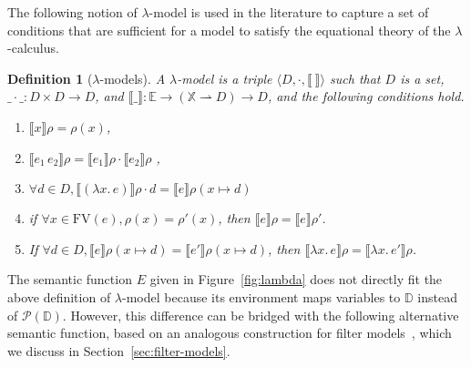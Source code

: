 \documentclass{tufte-handout}
\newcommand{\SEM}[1]{\llbracket #1 \rrbracket}
\newcommand{\LAM}[1]{\lambda #1.\,}
\newcommand{\APP}[0]{\,}
\newcommand{\pto}[0]{\rightharpoonup}
\newcommand{\VAR}[0]{\mathbb{X}}
\newcommand{\ext}[3]{#3(#1{\mapsto}#2)}
\newtheorem{definition}{Definition}%
\begin{document}



The following notion of $\lambda$-model is used in the literature to
capture a set of conditions that are sufficient for a model to satisfy
the equational theory of the $\lambda$-calculus.

\begin{definition}[$\lambda$-models]
  A \emph{$\lambda$-model} is a triple $\langle D, \cdot,
    \SEM{\ }\rangle$ such that $D$ is a set, $\_\cdot\_:D \times D \to
    D$, and $\SEM{\_} : \mathbb{E}\to(\VAR\pto D)\to D$, and the
    following conditions hold.
  \begin{enumerate}
  \item $\SEM{ x}\rho = \rho(x)$, \label{cond:var}
  \item $\SEM{e_1\APP e_2}\rho = \SEM{e_1}\rho \cdot \SEM{e_2}\rho$ \label{cond:app},
  \item  $\forall d \in D, \SEM{(\LAM{x}e)}\rho \cdot d = \SEM{e}\ext{x}{ d}{\rho}$ \label{cond:lam-app}
  \item if $\forall x \in \mathrm{FV}(e), \rho(x) = \rho'(x)$,
       then $\SEM{e}\rho = \SEM{e}\rho'$. \label{cond:env}
  \item If $\forall d \in D, \SEM{e}\ext{x}{ d}{\rho} = \SEM{e'}\ext{x}{ d}{\rho}$,
       then $\SEM{\LAM{x} e}\rho = \SEM{\LAM{x} e'}\rho$. \label{cond:lam}
  \end{enumerate}
\end{definition}

The semantic function $E$ given in Figure~\ref{fig:lambda} does not
directly fit the above definition of $\lambda$-model because its
environment maps variables to $\mathbb{D}$ instead of
$\mathcal{P}(\mathbb{D})$. However, this difference can be bridged
with the following alternative semantic function, based on an
analogous construction for filter models~\citep{Alessi:2006aa}, which
we discuss in Section~\ref{sec:filter-models}.
\end{document}
